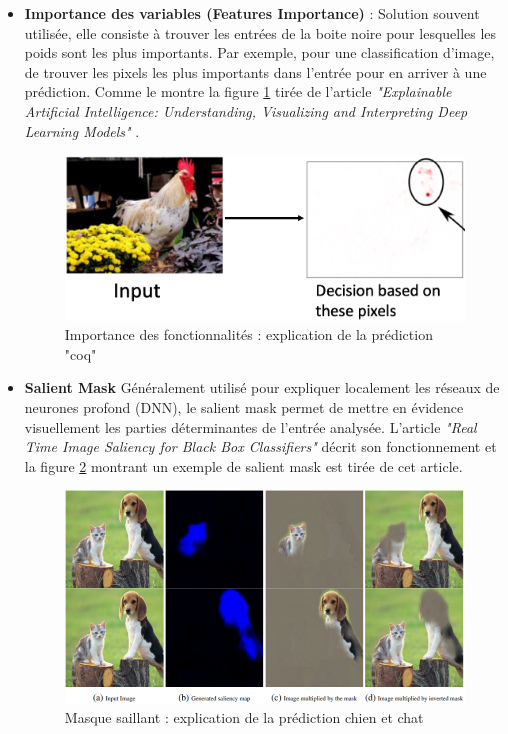 \begin{itemize}
    \item \textbf{Importance des variables (Features Importance)} : Solution souvent utilisée, elle consiste à trouver les entrées de la boite noire pour lesquelles les poids sont les plus importants. Par exemple, pour une classification d'image, de trouver les pixels les plus importants dans l'entrée pour en arriver à une prédiction. Comme le montre la figure \ref{chickenPixel} tirée de l'article \textit{"Explainable Artificial Intelligence: Understanding, Visualizing and Interpreting Deep Learning Models"} \cite{explainingIA}.\\
    \begin{figure}[h]
        \centering
        \includegraphics[scale=0.35]{src_img/chickenPixel.png}
        \caption{Importance des fonctionnalités : explication de la prédiction "coq"}
        \label{chickenPixel}
    \end{figure}
    
    \item \textbf{Salient Mask} Généralement utilisé pour expliquer localement les réseaux de neurones profond (DNN), le salient mask permet de mettre en évidence visuellement les parties déterminantes de l'entrée analysée. L'article \textit{"Real Time Image Saliency for Black Box Classifiers"}\cite{silentMask} décrit son fonctionnement et la figure \ref{silentMaskExemple} montrant un exemple de salient mask est tirée de cet article.
    \begin{figure}[h]
        \centering
        \includegraphics[scale=0.85]{src_img/silentMaskExemple.PNG}
        \caption{Masque saillant : explication de la prédiction chien et chat}
        \label{silentMaskExemple}
    \end{figure}
    

\end{itemize}

